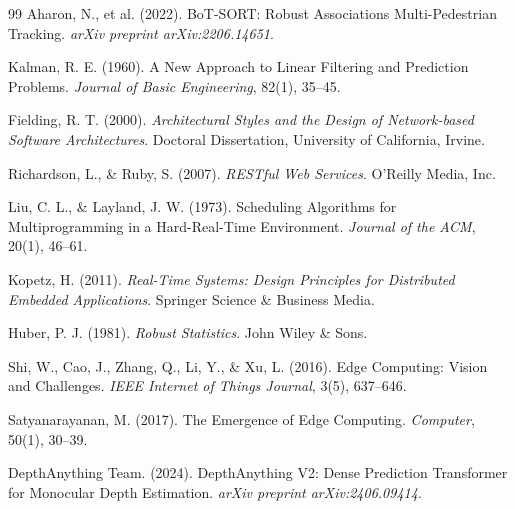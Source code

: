 \documentclass[12pt,a4paper]{article}
\begin{document}
\begin{thebibliography}{99}
Aharon, N., et al. (2022). BoT-SORT: Robust Associations Multi-Pedestrian Tracking. \textit{arXiv preprint arXiv:2206.14651}.

Kalman, R. E. (1960). A New Approach to Linear Filtering and Prediction Problems. \textit{Journal of Basic Engineering}, 82(1), 35--45.

Fielding, R. T. (2000). \textit{Architectural Styles and the Design of Network-based Software Architectures}. Doctoral Dissertation, University of California, Irvine.

Richardson, L., \& Ruby, S. (2007). \textit{RESTful Web Services}. O'Reilly Media, Inc.

Liu, C. L., \& Layland, J. W. (1973). Scheduling Algorithms for Multiprogramming in a Hard-Real-Time Environment. \textit{Journal of the ACM}, 20(1), 46--61.

Kopetz, H. (2011). \textit{Real-Time Systems: Design Principles for Distributed Embedded Applications}. Springer Science \& Business Media.

Huber, P. J. (1981). \textit{Robust Statistics}. John Wiley \& Sons.

Shi, W., Cao, J., Zhang, Q., Li, Y., \& Xu, L. (2016). Edge Computing: Vision and Challenges. \textit{IEEE Internet of Things Journal}, 3(5), 637--646.

Satyanarayanan, M. (2017). The Emergence of Edge Computing. \textit{Computer}, 50(1), 30--39.

DepthAnything Team. (2024). DepthAnything V2: Dense Prediction Transformer for Monocular Depth Estimation. \textit{arXiv preprint arXiv:2406.09414}.

\end{thebibliography}
\end{document}
